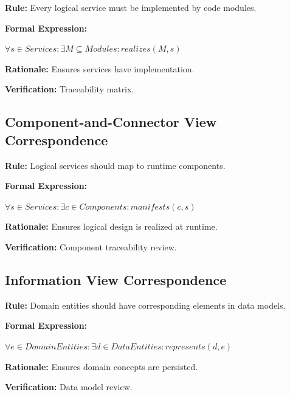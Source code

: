 \documentclass[11pt,letterpaper]{article}
\begin{document}
\begin{definitionbox}
\textbf{Rule:} Every logical service must be implemented by code modules.

\textbf{Formal Expression:}
\begin{center}
$\forall s \in Services : \exists M \subseteq Modules : realizes(M, s)$
\end{center}

\textbf{Rationale:} Ensures services have implementation.

\textbf{Verification:} Traceability matrix.
\end{definitionbox}

\subsection{Component-and-Connector View Correspondence}

\begin{definitionbox}
\textbf{Rule:} Logical services should map to runtime components.

\textbf{Formal Expression:}
\begin{center}
$\forall s \in Services : \exists c \in Components : manifests(c, s)$
\end{center}

\textbf{Rationale:} Ensures logical design is realized at runtime.

\textbf{Verification:} Component traceability review.
\end{definitionbox}

\subsection{Information View Correspondence}

\begin{definitionbox}
\textbf{Rule:} Domain entities should have corresponding elements in data models.

\textbf{Formal Expression:}
\begin{center}
$\forall e \in DomainEntities : \exists d \in DataEntities : represents(d, e)$
\end{center}

\textbf{Rationale:} Ensures domain concepts are persisted.

\textbf{Verification:} Data model review.
\end{definitionbox}
\end{document}
